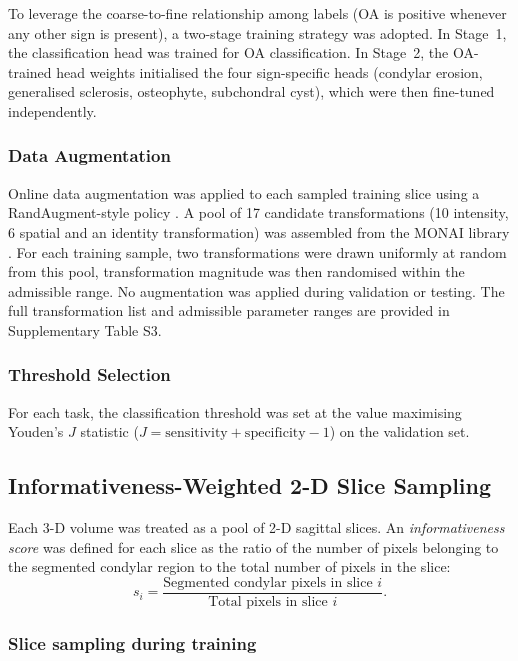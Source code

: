 \documentclass[review,12pt]{elsarticle}
\begin{document}
To leverage the coarse-to-fine relationship among labels (OA is positive
whenever any other sign is present), a two-stage training strategy was
adopted. In Stage~1, the classification head was trained for OA
classification. In Stage~2, the OA-trained head weights initialised the
four sign-specific heads (condylar erosion, generalised sclerosis,
osteophyte, subchondral cyst), which were then fine-tuned independently.

\subsubsection{Data Augmentation}

Online data augmentation was applied to each sampled training slice
using a RandAugment-style policy \cite{cubuk2020randaugment}. A pool of
17 candidate transformations (10 intensity, 6 spatial and an identity transformation) was assembled
from the MONAI library \cite{monai2026}. For each training sample, two
transformations were drawn uniformly at random from this pool, transformation magnitude was then randomised
within the admissible range. No augmentation was applied during
validation or testing. The full transformation list and admissible
parameter ranges are provided in Supplementary
Table S3.

\subsubsection{Threshold Selection}
\label{sec:threshold_selection}
For each task, the classification threshold was set at
the value maximising Youden's $J$ statistic
($J = \text{sensitivity} + \text{specificity} - 1$) on the validation set.

\subsection{Informativeness-Weighted 2-D Slice Sampling}

Each 3-D volume was treated as a pool of 2-D sagittal slices. An
\emph{informativeness score} was defined for each slice as the ratio of
the number of pixels belonging to the segmented condylar region to the
total number of pixels in the slice:
\begin{equation}
  s_i = \frac{\text{Segmented condylar pixels in slice } i}
             {\text{Total pixels in slice } i}.
  \label{eq:info}
\end{equation}

\subsubsection{Slice sampling during training}
\end{document}
